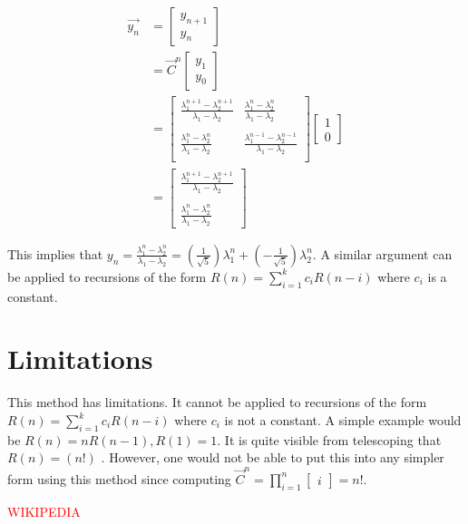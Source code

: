 \documentclass{article}
\begin{document}
\begin{align*} 
\vec{y_{n}}
&=  
\begin{bmatrix}
y_{n+1} \\
y_{n} 
\end{bmatrix}\\
&=
\vec{C}^{n}
\begin{bmatrix}
y_{1} \\
y_{0} 
\end{bmatrix}\\
&=
\begin{bmatrix}
\frac{\lambda_{1}^{n+1} - \lambda_{2}^{n+1}}{\lambda_{1}-\lambda_{2}} 
& \frac{\lambda_{1}^{n} - \lambda_{2}^{n}}{\lambda_{1}-\lambda_{2}}\\
 & \\
\frac{\lambda_{1}^{n} - \lambda_{2}^{n}}{\lambda_{1}-\lambda_{2}} 
& \frac{\lambda_{1}^{n-1} - \lambda_{2}^{n-1}}{\lambda_{1}-\lambda_{2}} \\
\end{bmatrix}
\begin{bmatrix}
1 \\
0 
\end{bmatrix}\\
&=
\begin{bmatrix}
\frac{\lambda_{1}^{n+1} - \lambda_{2}^{n+1}}{\lambda_{1}-\lambda_{2}} \\
\\
\frac{\lambda_{1}^{n} - \lambda_{2}^{n}}{\lambda_{1}-\lambda_{2}}
\end{bmatrix}
\end{align*}

This implies that 
$y_{n}=\frac{\lambda_{1}^{n} - \lambda_{2}^{n}}{\lambda_{1}-\lambda_{2}}=\left(\frac{1}{\sqrt{5}}\right)\lambda_{1}^{n}+\left(-\frac{1}{\sqrt{5}}\right)\lambda_{2}^{n}$.
A similar argument can be applied to recursions of the form 
$R(n)=\sum_{i=1}^{k}c_{i}R(n-i)$ where $c_{i}$ is a constant.

\section{Limitations}
This method has limitations. It cannot be applied to recursions of the form 
$R(n)=\sum_{i=1}^{k}c_{i}R(n-i)$ where $c_{i}$ is not a constant. A
simple example would be $R(n)=nR(n-1), R(1)=1$. It is quite visible from 
telescoping that $R(n)=(n!)$ . However, one would not be able to put this into
any simpler form using this method since computing 
$\vec{C}^n=\prod_{i=1}^{n}\begin{bmatrix}i\end{bmatrix}=n!$.

\begin{thebibliography}{9}

\textcolor{red}{WIKIPEDIA}

\end{thebibliography} %
 
\end{document}
